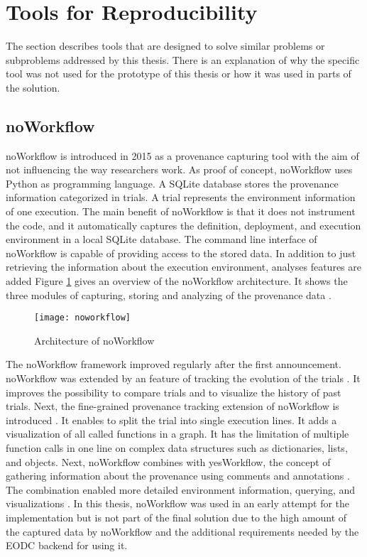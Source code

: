\documentclass[draft,final]{vutinfth} %
\begin{document}
\section{Tools for Reproducibility}\label{Existing Tools}
The section describes tools that are designed to solve similar problems or subproblems addressed by this thesis. There is an explanation of why the specific tool was not used for the prototype of this thesis or how it was used in parts of the solution. 

\subsection{noWorkflow}\label{Noworkflow}
noWorkflow is introduced in 2015 as a provenance capturing tool with the aim of not influencing the way researchers work. As proof of concept, noWorkflow uses Python as programming language. A SQLite database stores the provenance information categorized in trials. A trial represents the environment information of one execution. The main benefit of noWorkflow is that it does not instrument the code, and it automatically captures the definition, deployment, and execution environment in a local SQLite database. The command line interface of noWorkflow is capable of providing access to the stored data. In addition to just retrieving the information about the execution environment, analyses features are added Figure \ref{fig:noworkflow} gives an overview of the noWorkflow architecture. It shows the three modules of capturing, storing and analyzing of the provenance data \cite{c9e0604becba42af96a9cb0a6f60018b}.

\begin{figure}[h]
	\centering
	\texttt{[image: noworkflow]}
	\caption{Architecture of noWorkflow \cite{c9e0604becba42af96a9cb0a6f60018b}}
	\label{fig:noworkflow} %
\end{figure}

The noWorkflow framework improved regularly after the first announcement. noWorkflow was extended by an feature of tracking the evolution of the trials \cite{Pimentel2016TrackingAA}. It improves the possibility to compare trials and to visualize the history of past trials. Next, the fine-grained provenance tracking extension of noWorkflow is introduced \cite{Pimentel:2016:FPC:3090188.3090214}. It enables to split the trial into single execution lines. It adds a visualization of all called functions in a graph. It has the limitation of multiple function calls in one line on complex data structures such as dictionaries, lists, and objects. Next, noWorkflow combines with yesWorkflow, the concept of gathering information about the provenance using comments and annotations \cite{192094}. The combination enabled more detailed environment information, querying, and visualizations \cite{69bac1252a684629baa43b48e350068d}. 
In this thesis, noWorkflow was used in an early attempt for the implementation but is not part of the final solution due to the high amount of the captured data by noWorkflow and the additional requirements needed by the EODC backend for using it.
\end{document}
